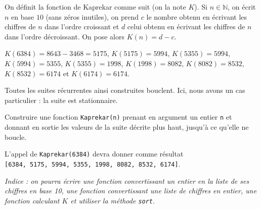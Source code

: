 \exer{}
\setcounter{numques}{0}

On définit la fonction de Kaprekar comme suit (on la note $K$). 
Si $n\in\mathbb{N}$, on écrit $n$ en base $10$ (sans zéros inutiles), on prend $c$ le nombre obtenu en écrivant les chiffres de $n$ dans l'ordre croissant et $d$ celui obtenu en écrivant les chiffres de $n$ dans l'ordre décroissant. 
On pose alors $K(n) = d-c$.
\begin{exemple}
  $K(6384) = 8643 - 3468 = 5175$, $K(5175) = 5994$, $K(5355) = 5994$, $K(5994) = 5355$, $K(5355) = 1998$, $K(1998)=8082$, $K(8082) = 8532$, $K(8532) = 6174$ et $K(6174) = 6174$.
\end{exemple}
Toutes les suites récurrentes ainsi construites bouclent. Ici, nous avons un cas particulier : la suite est stationnaire.

\question Construire une fonction \texttt{Kaprekar(n)} prenant en argument un entier \texttt{n} et donnant en sortie les valeurs de la suite décrite plus haut, jusqu'à ce qu'elle ne boucle. 

\begin{exemple}
  L'appel de \texttt{Kaprekar(6384)} devra donner comme résultat\\ \texttt{[6384, 5175, 5994, 5355, 1998, 8082, 8532, 6174]}.
\end{exemple}

\emph{Indice : on pourra écrire une fonction convertissant un entier en la liste de ses chiffres en base 10, une fonction convertissant une liste de chiffres en entier, une fonction calculant $K$ et utiliser la méthode \texttt{sort}}.

